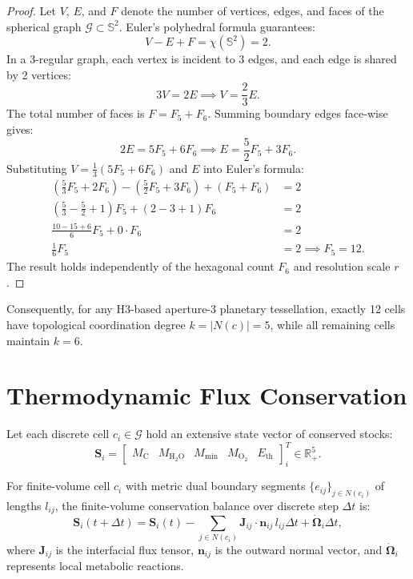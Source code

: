 \documentclass[11pt,a4paper]{article}
\begin{document}
\begin{proof}
Let $V$, $E$, and $F$ denote the number of vertices, edges, and faces of the spherical graph $\mathcal{G} \subset \mathbb{S}^2$. Euler's polyhedral formula guarantees:
\begin{equation}
V - E + F = \chi(\mathbb{S}^2) = 2.
\end{equation}
In a 3-regular graph, each vertex is incident to 3 edges, and each edge is shared by 2 vertices:
\begin{equation}
3V = 2E \implies V = \frac{2}{3}E.
\end{equation}
The total number of faces is $F = F_5 + F_6$. Summing boundary edges face-wise gives:
\begin{equation}
2E = 5F_5 + 6F_6 \implies E = \frac{5}{2}F_5 + 3F_6.
\end{equation}
Substituting $V = \frac{1}{3}(5F_5 + 6F_6)$ and $E$ into Euler's formula:
\begin{align}
\left(\frac{5}{3}F_5 + 2F_6\right) - \left(\frac{5}{2}F_5 + 3F_6\right) + (F_5 + F_6) &= 2 \\
\left(\frac{5}{3} - \frac{5}{2} + 1\right) F_5 + (2 - 3 + 1) F_6 &= 2 \\
\frac{10 - 15 + 6}{6} F_5 + 0 \cdot F_6 &= 2 \\
\frac{1}{6} F_5 &= 2 \implies F_5 = 12.
\end{align}
The result holds independently of the hexagonal count $F_6$ and resolution scale $r$.
\end{proof}

Consequently, for any H3-based aperture-3 planetary tessellation, exactly 12 cells have topological coordination degree $k = |N(c)| = 5$, while all remaining cells maintain $k = 6$.

\section{Thermodynamic Flux Conservation}

Let each discrete cell $c_i \in \mathcal{G}$ hold an extensive state vector of conserved stocks:
\begin{equation}
\mathbf{S}_i = \begin{bmatrix} M_{\text{C}} & M_{\text{H}_2\text{O}} & M_{\text{min}} & M_{\text{O}_2} & E_{\text{th}} \end{bmatrix}_i^T \in \mathbb{R}^5_+.
\end{equation}

For finite-volume cell $c_i$ with metric dual boundary segments $\{e_{ij}\}_{j \in N(c_i)}$ of lengths $l_{ij}$, the finite-volume conservation balance over discrete step $\Delta t$ is:
\begin{equation}
\mathbf{S}_i(t + \Delta t) = \mathbf{S}_i(t) - \sum_{j \in N(c_i)} \mathbf{J}_{ij} \cdot \mathbf{n}_{ij} \, l_{ij} \Delta t + \mathbf{\dot{\Omega}}_i \Delta t,
\end{equation}
where $\mathbf{J}_{ij}$ is the interfacial flux tensor, $\mathbf{n}_{ij}$ is the outward normal vector, and $\mathbf{\dot{\Omega}}_i$ represents local metabolic reactions.
\end{document}
